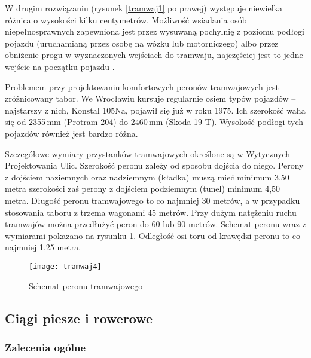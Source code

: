 \documentclass[twoside,12pt]{article}
\begin{document}
	W drugim rozwiązaniu (rysunek \ref{tramwaj1} po prawej) występuje niewielka różnica o wysokości kilku centymetrów. Możliwość wsiadania osób niepełnosprawnych zapewniona jest przez wysuwaną pochylnię z poziomu podłogi pojazdu (uruchamianą przez osobę na wózku lub motorniczego) albo przez obniżenie progu w wyznaczonych wejściach do tramwaju, najczęściej jest to jedne wejście na początku pojazdu \cite{makuch2}.
	
	Problemem przy projektowaniu komfortowych peronów tramwajowych jest zróżnicowany tabor. We Wrocławiu kursuje regularnie osiem typów pojazdów -- najstarszy z nich, Konstal 105Na, pojawił się już w roku 1975. Ich szerokość waha się od 2355\,mm (Protram 204) do 2460\,mm (Skoda 19 T). Wysokość podłogi tych pojazdów również jest bardzo różna. 
	
	Szczegółowe wymiary przystanków tramwajowych określone są w Wytycznych Projektowania Ulic. Szerokość peronu zależy od sposobu dojścia do niego. Perony z dojściem naziemnych oraz nadziemnym (kładka) muszą mieć minimum 3,50 metra szerokości zaś perony z dojściem podziemnym (tunel) minimum 4,50 metra. Długość peronu tramwajowego to co najmniej 30 metrów, a w przypadku stosowania taboru z trzema wagonami 45 metrów. Przy dużym natężeniu ruchu tramwajów można przedłużyć peron do 60 lub 90 metrów. Schemat peronu wraz z wymiarami pokazano na rysunku \ref{tramwaj4}. Odległość osi toru od krawędzi peronu to co najmniej 1,25 metra. 
	
		\begin{figure}[H]
		\centering
		\texttt{[image: tramwaj4]}\\
		\caption{Schemat peronu tramwajowego}
		\label{tramwaj4}
	\end{figure}	
	
	\clearpage
	\subsection{Ciągi piesze i rowerowe} \label{sec:ciagi_piesze}
	
	\subsubsection{Zalecenia ogólne}
	
\end{document}
